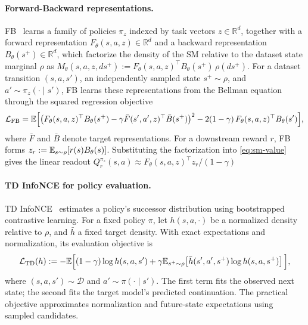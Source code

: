 \paragraph{Forward-Backward representations.}
FB~\citep{touati-neurips21a,touati-iclr23b} learns a family of policies $\pi_z$ indexed by task vectors $z\in\mathbb R^d$, together with a forward representation $F_\theta(s,a,z)\in\mathbb R^d$ and a backward representation $B_\theta(s^+)\in\mathbb R^d$, which factorize the density of the SM relative to the dataset state marginal $\rho$ as $ M_\theta(s,a,z,ds^+) := F_\theta(s,a,z)^\top B_\theta(s^+)\,\rho(ds^+).$
For a dataset transition $(s,a,s')$, an independently sampled state $s^+\sim\rho$, and $a'\sim\pi_z(\cdot\mid s')$, FB learns these representations from the Bellman equation through the squared regression objective
\begin{equation}
    \mathcal L_{\mathrm{FB}} = \mathbb{E}\Big[ \big( F_\theta(s,a,z)^\top B_\theta(s^+) - \gamma \bar F(s',a',z)^\top \bar B(s^+) \big)^2 - 2(1-\gamma)\, F_\theta(s,a,z)^\top B_\theta(s') \Big],
    \label{eq:fb-objective}
\end{equation}
where $\bar F$ and $\bar B$ denote target representations. 
For a downstream reward $r$, FB forms $z_r:=\mathbb{E}_{s\sim\rho}[r(s)B_\theta(s)]$. 
Substituting the factorization into \cref{eq:sm-value} gives the linear readout $Q_r^{\pi_z}(s,a)\approx F_\theta(s,a,z)^\top z_r/(1-\gamma)$

\paragraph{TD InfoNCE for policy evaluation.}
TD InfoNCE~\citep{zheng-iclr24a} estimates a policy's successor distribution using bootstrapped contrastive learning.
For a fixed policy $\pi$, let $h(s,a,\cdot)$ be a normalized density relative to $\rho$, and $\bar h$ a fixed target density.
With exact expectations and normalization, its evaluation objective is
\begin{equation}
        \mathcal L_{\mathrm{TD}}(h) :=-\mathbb{E}\Big[ (1-\gamma)\log h(s,a,s') +\gamma\mathbb{E}_{s^+\sim\rho}\!\left[ \bar h(s',a',s^+)\log h(s,a,s^+) \right] \Big],
        \label{eq:td-infonce-population}
\end{equation}
where $(s,a,s')\sim\mathcal D$ and $a'\sim\pi(\cdot\mid s')$.
The first term fits the observed next state; the second fits the target model's predicted continuation.
The practical objective approximates normalization and future-state expectations using sampled candidates.
